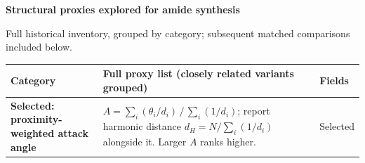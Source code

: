 \documentclass[11pt]{article}
\begin{document}
{\fontsize{24}{27}\selectfont\bfseries\color{maroon} Structural proxies explored for amide synthesis}\par
\vspace{4pt}
{\fontsize{11}{13}\selectfont Full historical inventory, grouped by category; subsequent matched comparisons included below.}\par
\vspace{7pt}
\fontsize{11.6}{13.3}\selectfont
\begin{tabularx}{\textwidth}{@{}>{\raggedright\arraybackslash{}}p{2.65in}Y>{\raggedright\arraybackslash}p{0.84in}@{}}
\toprule
\textbf{Category} & \textbf{Full proxy list (closely related variants grouped)} & \textbf{Fields} \\
\midrule
{}
\textbf{Selected: proximity-weighted attack angle} &
\textbf{$A=\sum_i(\theta_i/d_i)\,/\,\sum_i(1/d_i)$}; report harmonic distance $d_H=N/\sum_i(1/d_i)$ alongside it. Larger $A$ ranks higher. & Selected \\
\midrule

\end{tabularx}
\end{document}
